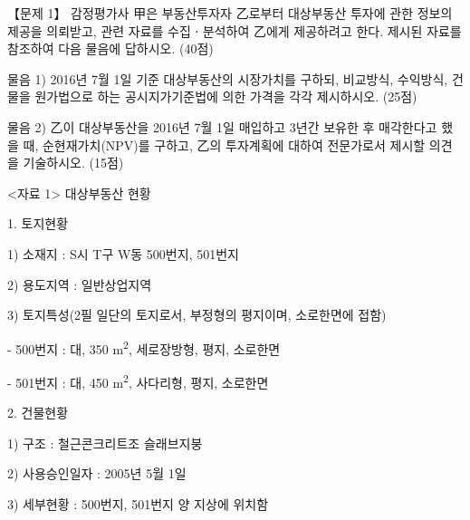 \begin{longquestion}{【문제 1】}
감정평가사 甲은 부동산투자자 乙로부터 대상부동산 투자에 관한 정보의 제공을 의뢰받고, 관련 자료를 수집ㆍ분석하여 乙에게 제공하려고 한다. 제시된 자료를 참조하여 다음 물음에 답하시오. (40점) \par
\medskip\noindent 물음 1) 2016년 7월 1일 기준 대상부동산의 시장가치를 구하되, 비교방식, 수익방식, 건물을 원가법으로 하는 공시지가기준법에 의한 가격을 각각 제시하시오. (25점) \par
\medskip\noindent 물음 2) 乙이 대상부동산을 2016년 7월 1일 매입하고 3년간 보유한 후 매각한다고 했을 때, 순현재가치(NPV)를 구하고, 乙의 투자계획에 대하여 전문가로서 제시할 의견을 기술하시오. (15점) \par
<자료 1> 대상부동산 현황 \par
1. 토지현황 \par
1) 소재지 : S시 T구 W동 500번지, 501번지 \par
2) 용도지역 : 일반상업지역 \par
3) 토지특성(2필 일단의 토지로서, 부정형의 평지이며, 소로한면에 접함) \par
- 500번지 : 대, 350 m\textsuperscript{2}, 세로장방형, 평지, 소로한면 \par
- 501번지 : 대, 450 m\textsuperscript{2}, 사다리형, 평지, 소로한면 \par
2. 건물현황 \par
1) 구조 : 철근콘크리트조 슬래브지붕 \par
2) 사용승인일자 : 2005년 5월 1일 \par
3) 세부현황 : 500번지, 501번지 양 지상에 위치함 \par
{\small\centering
{}\par}


\end{longquestion}
